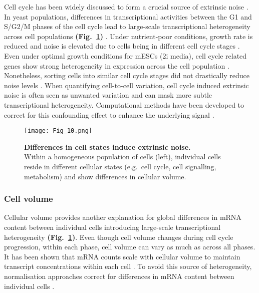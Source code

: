 Cell cycle has been widely discussed to form a crucial source of extrinsic noise \citep{Colman-Lerner2005, Newman2006}. 
In yeast populations, differences in transcriptional activities between the G1 and S/G2/M phases of the cell cycle lead to large-scale transcriptional heterogeneity across cell populations \textbf{(Fig.~\ref{fig0:extrinsic})} \citep{Zopf2013}. 
Under nutrient-poor conditions, growth rate is reduced and noise is elevated due to cells being in different cell cycle stages \citep{Keren2015}. 
Even under optimal growth conditions for mESCs (2i media), cell cycle related genes show strong heterogeneity in expression across the cell population \citep{Kolodziejczyk2015cell}. 
Nonetheless, sorting cells into similar cell cycle stages did not drastically reduce noise levels \citep{Raser2004}. When quantifying cell-to-cell variation, cell cycle induced extrinsic noise is often seen as unwanted variation and can mask more subtle transcriptional heterogeneity. 
Computational methods have been developed to correct for this confounding effect to enhance the underlying signal \citep{Buettner2015, Buettner2017}. 

\begin{figure}[!h]
\centering
\texttt{[image: Fig\_10.png]}
\caption[Differences in cell states induce extrinsic noise]{\textbf{Differences in cell states induce extrinsic noise.}\\
Within a homogeneous population of cells (left), individual cells reside in different cellular states (e.g.~cell cycle, cell signalling, metabolism) and show differences in cellular volume.}
\label{fig0:extrinsic}
\end{figure} 

\vspace{-5mm}

\subsubsection{Cell volume}

Cellular volume provides another explanation for global differences in mRNA content between individual cells introducing large-scale transcriptional heterogeneity \textbf{(Fig.~\ref{fig0:extrinsic})}. 
Even though cell volume changes during cell cycle progression, within each phase, cell volume can vary as much as across all phases. 
It has been shown that mRNA counts scale with cellular volume to maintain transcript concentrations within each cell \citep{Kempe2015, Padovan-Merhar2015, Zhurinsky2010}. 
To avoid this source of heterogeneity, normalisation approaches correct for differences in mRNA content between individual cells \citep{Vallejos2017}.

